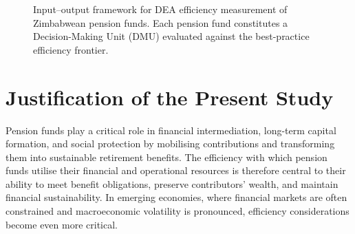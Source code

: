 \documentclass[12pt,a4paper]{article}
\begin{document}
\begin{figure}[H]
\centering
{}
\caption{Input--output framework for DEA efficiency measurement of Zimbabwean pension funds. Each pension fund constitutes a Decision-Making Unit (DMU) evaluated against the best-practice efficiency frontier.}
\label{fig:dea_framework}
\end{figure}

\section{Justification of the Present Study}

Pension funds play a critical role in financial intermediation, long-term capital formation, and social protection by mobilising contributions and transforming them into sustainable retirement benefits. The efficiency with which pension funds utilise their financial and operational resources is therefore central to their ability to meet benefit obligations, preserve contributors' wealth, and maintain financial sustainability. In emerging economies, where financial markets are often constrained and macroeconomic volatility is pronounced, efficiency considerations become even more critical.
\end{document}
